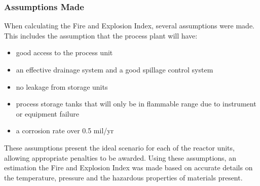 \subsubsection{Assumptions Made }

When calculating the Fire and Explosion Index, several assumptions were made. This includes the assumption that the process plant will have:
\begin{itemize}
\item good access to the process unit
\item an effective drainage system and a good spillage control system
\item no leakage from storage units 
\item process storage tanks that will only be in flammable range due to instrument or equipment failure
\item a corrosion rate over 0.5 mil/yr
\end{itemize}

 
These assumptions present the ideal scenario for each of the reactor units, allowing appropriate penalties to be awarded. Using these assumptions, an estimation the Fire and Explosion Index was made based on accurate details on the temperature, pressure and the hazardous properties of materials present. 

